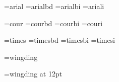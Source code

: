 




\def\lq{\char145 } \def\rq{\char146 }





\font\arial=arial
\font\arialbd=arialbd
\font\arialbi=arialbi
\font\ariali=ariali


\font\cour=cour
\font\courbd=courbd
\font\courbi=courbi
\font\couri=couri


\font\times=times
\font\timesbd=timesbd
\font\timesbi=timesbi
\font\timesi=timesi


\font\wingding=wingding

\font\wingdinglarge=wingding at 12pt


